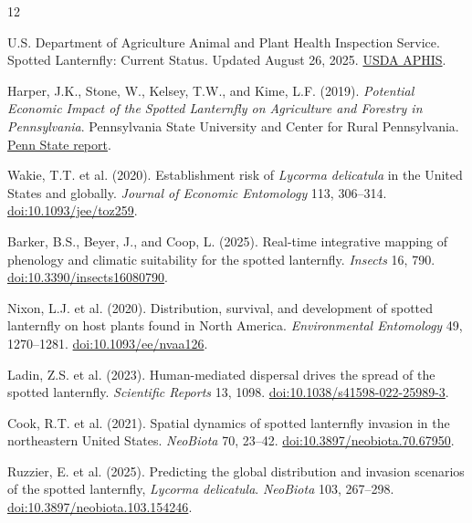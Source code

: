 \documentclass{article}
\begin{document}
{\footnotesize
\begin{thebibliography}{12}
\setlength{\itemsep}{0pt}

U.S. Department of Agriculture Animal and Plant Health Inspection Service.
Spotted Lanternfly: Current Status.
Updated August 26, 2025.
\href{https://www.aphis.usda.gov/plant-pests-diseases/slf}{USDA APHIS}.

Harper, J.K., Stone, W., Kelsey, T.W., and Kime, L.F. (2019).
\textit{Potential Economic Impact of the Spotted Lanternfly on Agriculture and Forestry in Pennsylvania}.
Pennsylvania State University and Center for Rural Pennsylvania.
\href{https://aese.psu.edu/research/centers/cecd/publications/economic-analyses-including-covid-19-analysis/economic-impact/spotted-lanternfly-2019.pdf/view}{Penn State report}.

Wakie, T.T. et al. (2020).
Establishment risk of \textit{Lycorma delicatula} in the United States and globally.
\textit{Journal of Economic Entomology} 113, 306--314.
\href{https://doi.org/10.1093/jee/toz259}{doi:10.1093/jee/toz259}.

Barker, B.S., Beyer, J., and Coop, L. (2025).
Real-time integrative mapping of phenology and climatic suitability for the spotted lanternfly.
\textit{Insects} 16, 790.
\href{https://doi.org/10.3390/insects16080790}{doi:10.3390/insects16080790}.

Nixon, L.J. et al. (2020).
Distribution, survival, and development of spotted lanternfly on host plants found in North America.
\textit{Environmental Entomology} 49, 1270--1281.
\href{https://doi.org/10.1093/ee/nvaa126}{doi:10.1093/ee/nvaa126}.

Ladin, Z.S. et al. (2023).
Human-mediated dispersal drives the spread of the spotted lanternfly.
\textit{Scientific Reports} 13, 1098.
\href{https://doi.org/10.1038/s41598-022-25989-3}{doi:10.1038/s41598-022-25989-3}.

Cook, R.T. et al. (2021).
Spatial dynamics of spotted lanternfly invasion in the northeastern United States.
\textit{NeoBiota} 70, 23--42.
\href{https://doi.org/10.3897/neobiota.70.67950}{doi:10.3897/neobiota.70.67950}.

Ruzzier, E. et al. (2025).
Predicting the global distribution and invasion scenarios of the spotted lanternfly, \textit{Lycorma delicatula}.
\textit{NeoBiota} 103, 267--298.
\href{https://doi.org/10.3897/neobiota.103.154246}{doi:10.3897/neobiota.103.154246}.


\end{thebibliography}}
\end{document}
